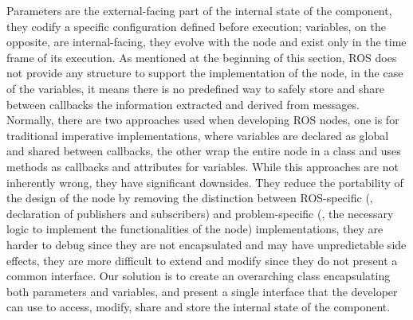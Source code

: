 Parameters are the external-facing part of the internal state of the component, they codify a specific configuration defined before execution; variables, on the opposite, are internal-facing, they evolve with the node and exist only in the time frame of its execution. As mentioned at the beginning of this section, ROS does not provide any structure to support the implementation of the node, in the case of the variables, it means there is no predefined way to safely store and share between callbacks the information extracted and derived from messages. Normally, there are two approaches used when developing ROS nodes, one is for traditional imperative implementations, where variables are declared as global and shared between callbacks, the other wrap the entire node in a class and uses methods as callbacks and attributes for variables. While this approaches are not inherently wrong, they have significant downsides. They reduce the portability of the design of the node by removing the distinction between ROS-specific (\eg, declaration of publishers and subscribers) and problem-specific (\ie, the necessary logic to implement the functionalities of the node) implementations, they are harder to debug since they are not encapsulated and may have unpredictable side effects, they are more difficult to extend and modify since they do not present a common interface. Our solution is to create an overarching class encapsulating both parameters and variables, and present a single interface that the developer can use to access, modify, share and store the internal state of the component.


